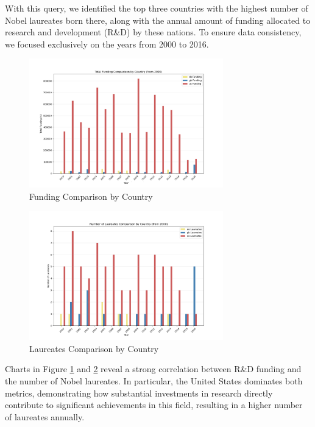 \documentclass{article}
\begin{document}
\vspace{1em}

With this query, we identified the top three countries with the highest number of Nobel laureates born there,
along with the annual amount of funding allocated to research and development (R\&D) by these nations.
To ensure data consistency, we focused exclusively on the years from 2000 to 2016.

\begin{figure}[H]
	\centering
	\includegraphics[width=0.75\textwidth]{../queries/plots/funding_comparison_by_country.png}
	\caption{Funding Comparison by Country}
	\label{fig:fundings_per_country}
\end{figure}

\begin{figure}[H]
	\centering
	\includegraphics[width=0.75\textwidth]{../queries/plots/laureates_comparison_by_country.png}
	\caption{Laureates Comparison by Country}
	\label{fig:laureates_per_country}
\end{figure}

Charts in Figure \ref{fig:fundings_per_country} and \ref{fig:laureates_per_country} reveal a strong correlation between R\&D
funding and the number of Nobel laureates. In particular, the United States dominates both metrics, demonstrating
how substantial investments in research directly contribute to significant achievements in this field, resulting
in a higher number of laureates annually.
\end{document}
